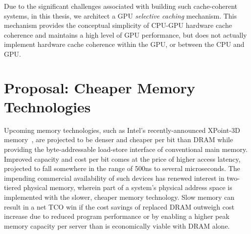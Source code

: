 Due to the significant challenges associated with building such cache-coherent
systems, in this thesis, we architect a GPU \textit{selective caching} mechanism.
This mechanism provides the conceptual simplicity of CPU-GPU hardware cache
coherence and maintains a high level of GPU performance, but does not actually
implement hardware cache coherence within the GPU, or between the CPU and GPU.

\section{Proposal: Cheaper Memory Technologies}
Upcoming memory technologies, such as Intel's recently-announced XPoint-3D
memory~\cite{xpoint}, are projected to be denser and cheaper per bit than DRAM
while providing the byte-addressable load-store interface of conventional main
memory.  Improved capacity and cost per bit comes at the price of higher access
latency, projected to fall somewhere in the range of 500ns to several
microseconds.  The impending commercial availability of such devices has renewed
interest in two-tiered physical memory, wherein part of a system's physical
address space is implemented with the slower, cheaper memory technology.  Slow
memory can result in a net TCO win if the cost savings of replaced DRAM outweigh
cost increase due to reduced program performance or by enabling a higher peak
memory capacity per server than is economically viable with DRAM alone.  




